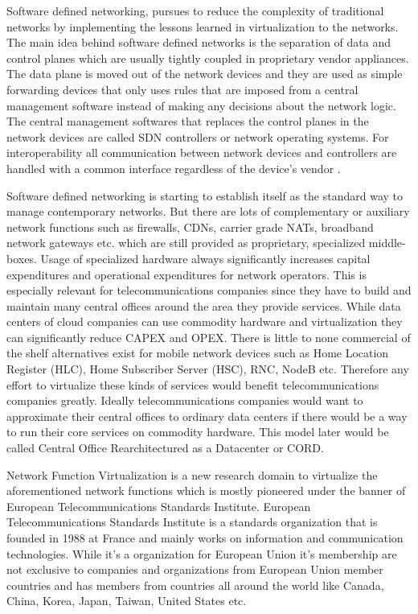 \documentclass[12pt,oneandhalf,chaparabic,ceng,ms,eng,oneside,pntc]{gsufbe}
\begin{document}
Software defined networking, pursues to reduce the complexity of traditional networks by implementing 
the lessons learned in virtualization to the networks.  The main idea behind software defined networks
is the separation of data and control planes which are usually tightly coupled in proprietary vendor
appliances.  The data plane is moved out of the network devices and they are used as simple forwarding
devices that only uses rules that are imposed from a central management software instead of making any
decisions about the network logic.  The central management softwares that replaces the control planes in
the network devices are called SDN controllers or network operating systems.  For interoperability all
communication between network devices and controllers are handled with a common interface regardless of
the device's vendor \cite{li_software_defined_2015}.

Software defined networking is starting to establish itself as the standard way to manage contemporary
networks.  But there are lots of complementary or auxiliary network functions such as firewalls, CDNs,
carrier grade NATs, broadband network gateways etc.  which are still provided as proprietary,
specialized middle-boxes.  Usage of specialized hardware always significantly increases capital
expenditures and operational expenditures for network operators.  This is especially relevant for
telecommunications companies since they have to build and maintain many central offices around
the area they provide services.  While data centers of cloud companies can use commodity hardware and
virtualization they can significantly reduce CAPEX and OPEX.  There is little to none commercial of the
shelf alternatives exist for mobile network devices such as Home Location Register (HLC), Home
Subscriber Server (HSC), RNC, NodeB etc.  \cite{khalid_standardized_2016} Therefore any effort to 
virtualize these kinds of services
would benefit telecommunications companies greatly.  Ideally telecommunications
companies would want to
approximate their central offices to ordinary data centers if there would be a way to run their core
services on commodity hardware.  This model later would be called Central Office Rearchitectured as a
Datacenter or CORD.

Network Function Virtualization is a new research domain to virtualize the aforementioned network
functions which is mostly pioneered under the banner of European Telecommunications Standards
Institute.  European Telecommunications Standards Institute \cite{etsi} is a standards organization
that is
founded in 1988 at France and mainly works on information and communication technologies.  While it's a
organization for European Union it's membership are not exclusive to companies and organizations from
European Union member countries and has members from countries all around the world like Canada, China,
Korea, Japan, Taiwan, United States etc.
\end{document}
